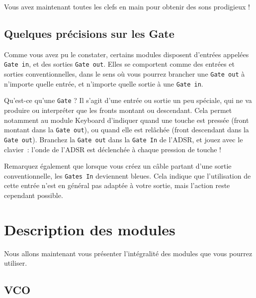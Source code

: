 \documentclass[a4paper,oneside,frenchb,10pt]{article}
\begin{document}
Vous avez maintenant toutes les clefs en main pour obtenir des sons
prodigieux !

\subsection{Quelques précisions sur les Gate}

Comme vous avez pu le constater, certains modules disposent d'entrées
appelées \verb!Gate in!, et des sorties \verb!Gate out!. Elles se
comportent comme des entrées et sorties conventionnelles, dans le sens
où vous pourrez brancher une \verb!Gate out! à n'importe quelle entrée,
et n'importe quelle sortie à une \verb!Gate in!.

Qu'est-ce qu'une \verb!Gate! ? Il s'agit d'une entrée ou sortie un peu
spéciale, qui ne va produire ou interpréter que les fronts montant ou
descendant. Cela permet notamment au module Keyboard d'indiquer quand
une touche est pressée (front montant dans la \verb!Gate out!), ou quand
elle est relâchée (front descendant dans la \verb!Gate out!). Branchez
la \verb!Gate out! dans la \verb!Gate In! de l'ADSR, et jouez avec le
clavier~: l'onde de l'ADSR est déclenchée à chaque pression de touche !

Remarquez également que lorsque vous créez un câble partant d'une sortie
conventionnelle, les \verb!Gates In! deviennent bleues. Cela indique que
l'utilisation de cette entrée n'est en général pas adaptée à votre
sortie, mais l'action reste cependant possible.

\section{Description des modules}

Nous allons maintenant vous présenter l'intégralité des modules que vous
pourrez utiliser.

\subsection{VCO}
\end{document}
